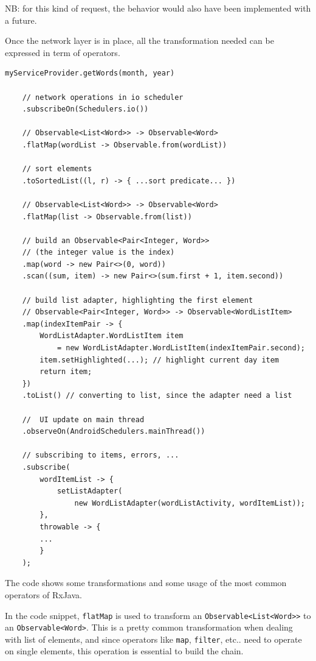 NB: for this kind of request, the behavior would also have been
implemented with a future.

Once the network layer is in place, all the transformation needed can be
expressed in term of operators.

\begin{verbatim}
myServiceProvider.getWords(month, year)

    // network operations in io scheduler
    .subscribeOn(Schedulers.io())

    // Observable<List<Word>> -> Observable<Word>
    .flatMap(wordList -> Observable.from(wordList))

    // sort elements
    .toSortedList((l, r) -> { ...sort predicate... })

    // Observable<List<Word>> -> Observable<Word>
    .flatMap(list -> Observable.from(list))

    // build an Observable<Pair<Integer, Word>> 
    // (the integer value is the index)
    .map(word -> new Pair<>(0, word))
    .scan((sum, item) -> new Pair<>(sum.first + 1, item.second))

    // build list adapter, highlighting the first element
    // Observable<Pair<Integer, Word>> -> Observable<WordListItem>
    .map(indexItemPair -> { 
        WordListAdapter.WordListItem item 
        	= new WordListAdapter.WordListItem(indexItemPair.second);
        item.setHighlighted(...); // highlight current day item
        return item;
    })
    .toList() // converting to list, since the adapter need a list

    //  UI update on main thread
    .observeOn(AndroidSchedulers.mainThread())

    // subscribing to items, errors, ...
    .subscribe(
        wordItemList -> {
            setListAdapter(
            	new WordListAdapter(wordListActivity, wordItemList));
        },
        throwable -> {
        ...
        }
    );
\end{verbatim}

The code shows some transformations and some usage of the most common
operators of RxJava.

In the code snippet, \texttt{flatMap} is used to transform an
\texttt{Observable\textless{}List\textless{}Word\textgreater{}\textgreater{}}
to an \texttt{Observable\textless{}Word\textgreater{}}. This is a pretty
common transformation when dealing with list of elements, and since
operators like \texttt{map}, \texttt{filter}, etc.. need to operate on
single elements, this operation is essential to build the chain.

